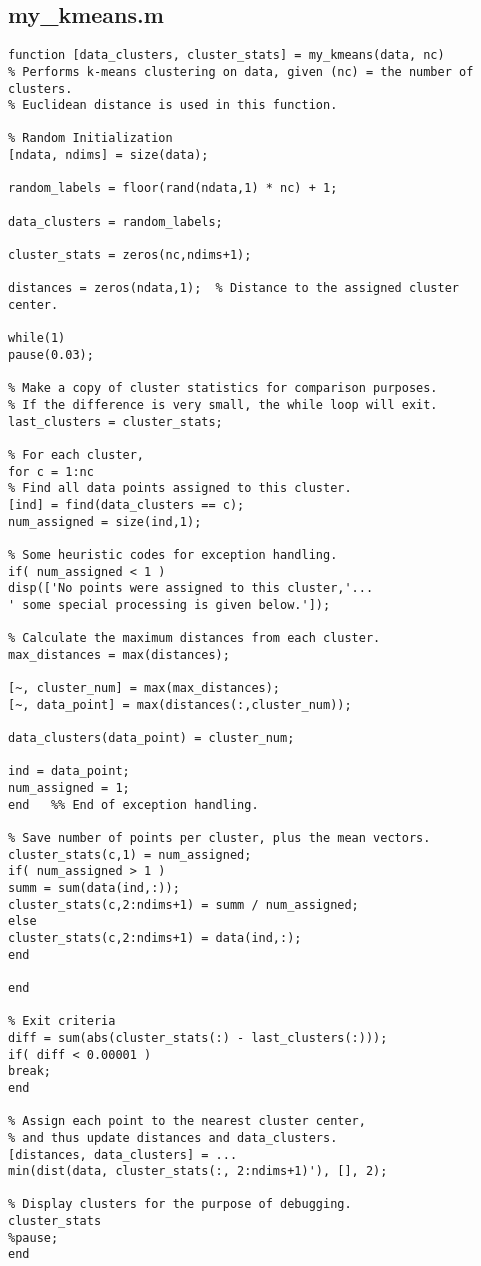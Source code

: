 \documentclass{article}
\begin{document}
\subsection{my\_kmeans.m}
\label{code-2}
\begin{lstlisting}
function [data_clusters, cluster_stats] = my_kmeans(data, nc)
% Performs k-means clustering on data, given (nc) = the number of clusters.
% Euclidean distance is used in this function.

% Random Initialization
[ndata, ndims] = size(data);

random_labels = floor(rand(ndata,1) * nc) + 1;

data_clusters = random_labels;

cluster_stats = zeros(nc,ndims+1);

distances = zeros(ndata,1);  % Distance to the assigned cluster center.

while(1)
pause(0.03);

% Make a copy of cluster statistics for comparison purposes.
% If the difference is very small, the while loop will exit.
last_clusters = cluster_stats;

% For each cluster,
for c = 1:nc
% Find all data points assigned to this cluster.
[ind] = find(data_clusters == c);
num_assigned = size(ind,1);

% Some heuristic codes for exception handling.
if( num_assigned < 1 )
disp(['No points were assigned to this cluster,'...
' some special processing is given below.']);

% Calculate the maximum distances from each cluster.
max_distances = max(distances);

[~, cluster_num] = max(max_distances);
[~, data_point] = max(distances(:,cluster_num));

data_clusters(data_point) = cluster_num;

ind = data_point;
num_assigned = 1;
end   %% End of exception handling.

% Save number of points per cluster, plus the mean vectors.
cluster_stats(c,1) = num_assigned;
if( num_assigned > 1 )
summ = sum(data(ind,:));
cluster_stats(c,2:ndims+1) = summ / num_assigned;
else
cluster_stats(c,2:ndims+1) = data(ind,:);
end

end

% Exit criteria
diff = sum(abs(cluster_stats(:) - last_clusters(:)));
if( diff < 0.00001 )
break;
end

% Assign each point to the nearest cluster center,
% and thus update distances and data_clusters.
[distances, data_clusters] = ...
min(dist(data, cluster_stats(:, 2:ndims+1)'), [], 2);

% Display clusters for the purpose of debugging.
cluster_stats
%pause;
end

\end{lstlisting}
\end{document}

